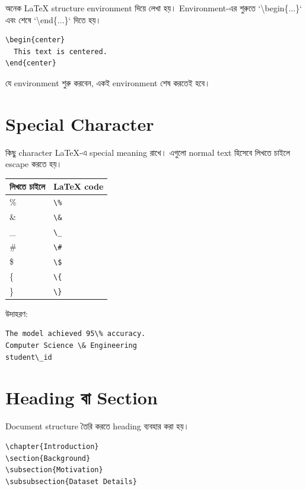 \documentclass[12pt,a4paper]{article}
\newcommand{\bn}[1]{{\normalfont\banglafont #1}}
\begin{document}
\bn{অনেক LaTeX structure environment দিয়ে লেখা হয়। Environment-এর শুরুতে
`\textbackslash begin\{...\}` এবং শেষে `\textbackslash end\{...\}` দিতে হয়।}

\begin{verbatim}
\begin{center}
  This text is centered.
\end{center}
\end{verbatim}

\bn{যে environment শুরু করবেন, একই environment শেষ করতেই হবে।}

\section{\bn{Special Character}}

\bn{কিছু character LaTeX-এ special meaning রাখে। এগুলো normal text হিসেবে
লিখতে চাইলে escape করতে হয়।}

\begin{center}
\begin{tabular}{ll}
\toprule
\bn{লিখতে চাইলে} & \bn{LaTeX code} \\
\midrule
\% & \verb|\%| \\
\& & \verb|\&| \\
\_ & \verb|\_| \\
\# & \verb|\#| \\
\$ & \verb|\$| \\
\{ & \verb|\{| \\
\} & \verb|\}| \\
\bottomrule
\end{tabular}
\end{center}

\bn{উদাহরণ:}

\begin{verbatim}
The model achieved 95\% accuracy.
Computer Science \& Engineering
student\_id
\end{verbatim}

\section{\bn{Heading বা Section}}

\bn{Document structure তৈরি করতে heading ব্যবহার করা হয়।}

\begin{verbatim}
\chapter{Introduction}
\section{Background}
\subsection{Motivation}
\subsubsection{Dataset Details}
\end{verbatim}
\end{document}
